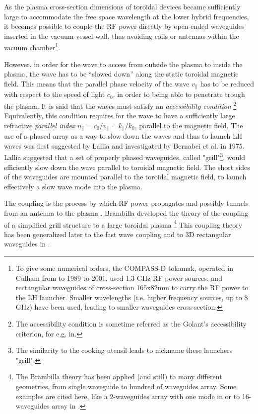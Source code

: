 {As the plasma cross-section dimensions of toroidal devices became sufficiently large to accommodate the free space wavelength at the lower hybrid frequencies, it becomes possible to couple the RF power directly by open-ended waveguides inserted in the vacuum vessel wall, thus avoiding coils or antennas within the vacuum chamber\footnote{To give some numerical orders, the COMPASS-D tokamak, operated in Culham from to 1989 to 2001, used 1.3 GHz RF power sources, and rectangular waveguides of cross-section 165x82mm to carry the RF power to the LH launcher. Smaller wavelengths (i.e. higher frequency sources, up to 8 GHz) have been used, leading to smaller waveguides cross-section.}.

However, in order for the wave to access from outside the plasma to inside the plasma, the wave has to be “slowed down” along the static toroidal magnetic field. This means that the parallel phase velocity of the wave $v_{\parallel}$ has to be reduced with respect to the speed of light $c_0$, in order to being able to penetrate trough the plasma. It is said that the waves must satisfy an \emph{accessibility condition} \footnote{The accessibility condition is sometime referred as the Golant's accessibility criterion, for e.g. in.} Equivalently, this condition requires for the wave to have a sufficiently large refractive \emph{parallel index} $n_{\parallel} = c_0/v_{\parallel} = k_{\parallel}/k_0$, parallel to the magnetic field. The use of a phased array as a way to slow down the waves and thus to launch LH waves was first suggested by Lallia and investigated by Bernabei et al. in 1975. Lallia suggested that a set of properly phased waveguides, called "grill"\footnote{The similarity to the cooking utensil leads to nickname these launchers "grill".}, would efficiently slow down the wave parallel to toroidal magnetic field. The short sides of the waveguides are mounted parallel to the toroidal magnetic field, to launch effectively a slow wave mode into the plasma. 

The coupling is the process by which RF power propagates and possibly tunnels from an antenna to the plasma . Brambilla developed the theory of the coupling of  a simplified grill structure to a large toroidal plasma  \footnote{The Brambilla theory has been applied (and still) to many different geometries, from single waveguide to hundred of waveguides array. Some examples are cited here, like a 2-waveguides array with one mode in  or to 16-waveguides array in .} This coupling theory has been generalized later to the fast wave coupling  and to 3D rectangular waveguides in . 

}
